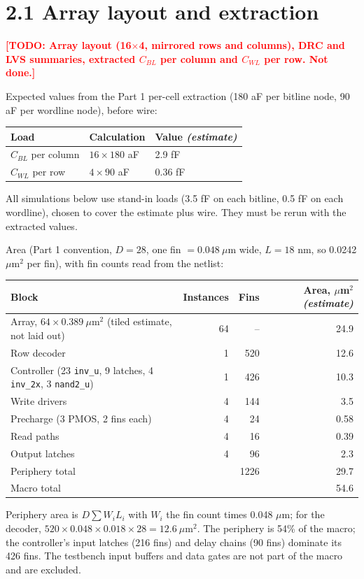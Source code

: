 \documentclass[10pt,letterpaper]{article}
\newcommand{\todo}[1]{\textcolor{red}{\textbf{[TODO: #1]}}}
\newcommand{\est}{\textit{(estimate)}}
\newcommand{\code}[1]{\texttt{#1}}
\begin{document}
\section*{2.1 Array layout and extraction}
\todo{Array layout (16$\times$4, mirrored rows and columns), DRC and LVS summaries, extracted $C_{BL}$ per column and $C_{WL}$ per row. Not done.}

Expected values from the Part 1 per-cell extraction (180 aF per bitline node, 90 aF per wordline node), before wire:
\begin{center}\begin{tabular}{lll}\toprule Load & Calculation & Value \est\\\midrule
$C_{BL}$ per column & $16\times180$ aF & 2.9 fF\\
$C_{WL}$ per row & $4\times90$ aF & 0.36 fF\\\bottomrule\end{tabular}\end{center}
All simulations below use stand-in loads (3.5 fF on each bitline, 0.5 fF on each wordline), chosen to cover the estimate plus wire. They must be rerun with the extracted values.

Area (Part 1 convention, $D=28$, one fin $=0.048\ \mu$m wide, $L=18$ nm, so 0.0242 $\mu$m$^2$ per fin), with fin counts read from the netlist:
\begin{center}\begin{tabular}{lrrr}\toprule Block & Instances & Fins & Area, $\mu$m$^2$ \est\\\midrule
Array, $64\times0.389\ \mu$m$^2$ (tiled estimate, not laid out) & 64 & -- & 24.9\\
Row decoder & 1 & 520 & 12.6\\
Controller (23 \code{inv\_u}, 9 latches, 4 \code{inv\_2x}, 3 \code{nand2\_u}) & 1 & 426 & 10.3\\
Write drivers & 4 & 144 & 3.5\\
Precharge (3 PMOS, 2 fins each) & 4 & 24 & 0.58\\
Read paths & 4 & 16 & 0.39\\
Output latches & 4 & 96 & 2.3\\\midrule
Periphery total & & 1226 & 29.7\\
Macro total & & & 54.6\\\bottomrule\end{tabular}\end{center}
Periphery area is $D\sum W_iL_i$ with $W_i$ the fin count times 0.048 $\mu$m; for the decoder, $520\times0.048\times0.018\times28=12.6\ \mu$m$^2$. The periphery is 54\% of the macro; the controller's input latches (216 fins) and delay chains (90 fins) dominate its 426 fins. The testbench input buffers and data gates are not part of the macro and are excluded.
\end{document}
